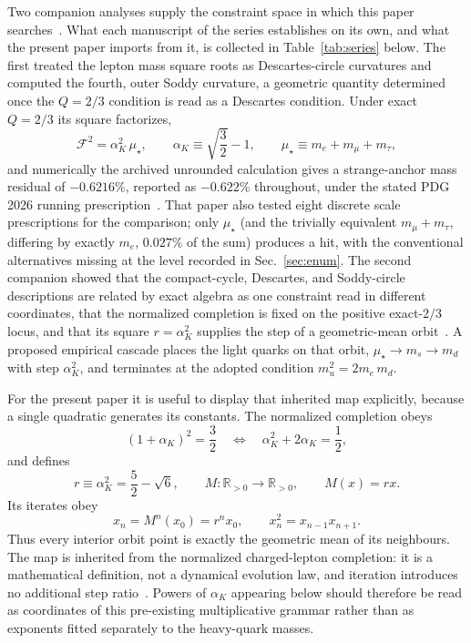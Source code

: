 \documentclass[aps,twocolumn,superscriptaddress,nofootinbib,floatfix]{revtex4-2}
\newcommand{\mstar}{\mu_\star}
\newcommand{\alphaK}{\alpha_K}
\newcommand{\R}{\mathbb{R}}
\begin{document}
Two companion analyses supply the constraint space in which this paper searches~\cite{BrilliantAPPB,BrilliantMPLA}. What each manuscript of the series establishes on its own, and what the present paper imports from it, is collected in Table~\ref{tab:series} below. The first treated the lepton mass square roots as Descartes-circle curvatures and computed the fourth, outer Soddy curvature, a geometric quantity determined once the $Q=2/3$ condition is read as a Descartes condition. Under exact $Q=2/3$ its square factorizes,
\begin{equation}
\mathcal F^2=\alpha_K^2\,\mstar,
\qquad
\alpha_K\equiv\sqrt{\frac32}-1,
\qquad
\mstar\equiv m_e+m_\mu+m_\tau,
\label{eq:f2}
\end{equation}
and numerically the archived unrounded calculation gives a strange-anchor mass residual of $-0.6216\%$, reported as $-0.622\%$ throughout, under the stated PDG 2026 running prescription~\cite{BrilliantAPPB}. That paper also tested eight discrete scale prescriptions for the comparison; only $\mstar$ (and the trivially equivalent $m_\mu+m_\tau$, differing by exactly $m_e$, $0.027\%$ of the sum) produces a hit, with the conventional alternatives missing at the level recorded in Sec.~\ref{sec:enum}. The second companion showed that the compact-cycle, Descartes, and Soddy-circle descriptions are related by exact algebra as one constraint read in different coordinates, that the normalized completion is fixed on the positive exact-$2/3$ locus, and that its square $r=\alpha_K^2$ supplies the step of a geometric-mean orbit~\cite{BrilliantMPLA}. A proposed empirical cascade places the light quarks on that orbit, $\mstar\to m_s\to m_d$ with step $\alpha_K^2$, and terminates at the adopted condition $m_u^2=2m_e\,m_d$.

For the present paper it is useful to display that inherited map explicitly, because a single quadratic generates its constants. The normalized completion obeys
\begin{equation}
(1+\alphaK)^2=\frac32
\quad\Longleftrightarrow\quad
\alphaK^2+2\alphaK=\frac12,
\label{eq:quadratic}
\end{equation}
and defines
\begin{equation}
r\equiv\alphaK^2=\frac52-\sqrt6,
\qquad
M:\R_{>0}\to\R_{>0},
\qquad
M(x)=rx .
\label{eq:companionmap}
\end{equation}
Its iterates obey
\begin{equation}
x_n=M^n(x_0)=r^n x_0,
\qquad
x_n^2=x_{n-1}x_{n+1}.
\label{eq:companionorbit}
\end{equation}
Thus every interior orbit point is exactly the geometric mean of its neighbours. The map is inherited from the normalized charged-lepton completion: it is a mathematical definition, not a dynamical evolution law, and iteration introduces no additional step ratio~\cite{BrilliantMPLA}. Powers of $\alphaK$ appearing below should therefore be read as coordinates of this pre-existing multiplicative grammar rather than as exponents fitted separately to the heavy-quark masses.
\end{document}
